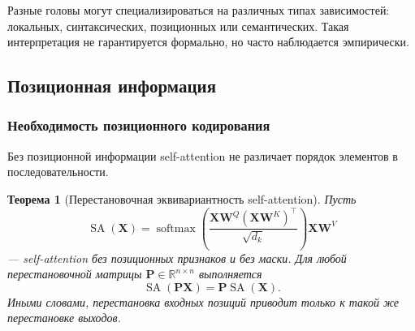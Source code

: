 \documentclass[12pt,a4paper]{article}
\newtheorem{theorem}{Теорема}[section]
\theoremstyle{definition}
\newcommand{\R}{\mathbb{R}}
\newcommand{\softmax}{\operatorname{softmax}}
\newcommand{\1}{\mathbf{1}}
\begin{document}
Разные головы могут специализироваться на различных типах
зависимостей: локальных, синтаксических, позиционных или семантических.
Такая интерпретация не гарантируется формально, но часто наблюдается
эмпирически.

\subsection{Позиционная информация}

\subsubsection{Необходимость позиционного кодирования}

Без позиционной информации self-attention не различает порядок
элементов в последовательности.

\begin{theorem}[Перестановочная эквивариантность self-attention]
Пусть
\[
    \operatorname{SA}(\bm{X})
    =
    \softmax\left(
        \frac{\bm{X}\bm{W}^Q
        (\bm{X}\bm{W}^K)^{\top}}{\sqrt{d_k}}
    \right)
    \bm{X}\bm{W}^V
\]
--- self-attention без позиционных признаков и без маски. Для любой
перестановочной матрицы $\bm{P}\in\R^{n\times n}$ выполняется
\[
    \operatorname{SA}(\bm{P}\bm{X})
    =
    \bm{P}\operatorname{SA}(\bm{X}).
\]
Иными словами, перестановка входных позиций приводит только к такой
же перестановке выходов.
\end{theorem}
\end{document}
